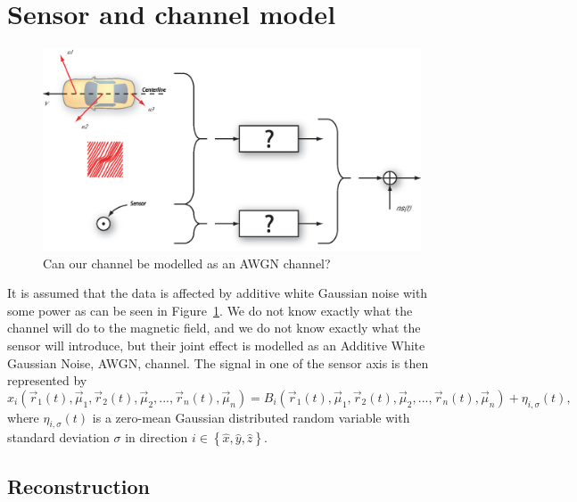 \section{Sensor and channel model}
\begin{figure}
	\centering
	\begin{minipage}{0.6\linewidth}
		\centering
		\includegraphics[width=1\linewidth]{images/channelmodel.eps}
		\caption{Can our channel be modelled as an AWGN channel?}
		\label{fig:channelmodel}
	\end{minipage}
\end{figure}

It is assumed that the data is affected by additive white Gaussian noise with some power as can be seen in Figure~\ref{fig:channelmodel}. We do not know exactly what the channel will do to the magnetic field, and we do not know exactly what the sensor will introduce, but their joint effect is modelled as an Additive White Gaussian Noise, AWGN, channel. The signal in one of the sensor axis is then represented by
\begin{equation}
x_i(\vec{r}_1(t),\vec{\mu}_1, \vec{r}_2(t), \vec{\mu}_2,...,\vec{r}_n(t),\vec{\mu}_n) = B_i(\vec{r}_1(t),\vec{\mu}_1, \vec{r}_2(t), \vec{\mu}_2,...,\vec{r}_n(t),\vec{\mu}_n) + \eta_{i,\sigma}(t),
\end{equation}
where $\eta_{i,\sigma}(t)$ is a zero-mean Gaussian distributed random variable with standard deviation $\sigma$ in direction $i \in \left\lbrace\hat{x}, \hat{y}, \hat{z}\right\rbrace$.

\subsection{Reconstruction}

